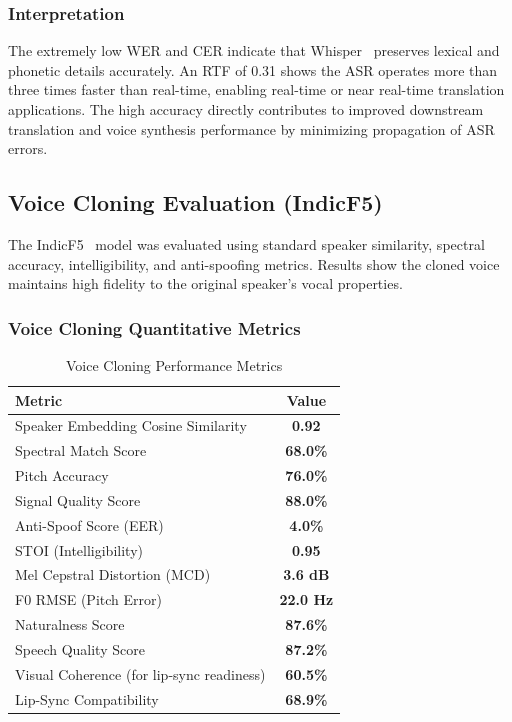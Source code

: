 \documentclass[12pt,oneside]{report}
\begin{document}
\subsubsection*{Interpretation}

The extremely low WER and CER indicate that Whisper~\cite{radford2023whisper} preserves lexical and phonetic details accurately.  
An RTF of 0.31 shows the ASR operates more than three times faster than real-time, enabling real-time or near real-time translation applications. The high accuracy directly contributes to improved downstream translation and voice synthesis performance by minimizing propagation of ASR errors.


\subsection{Voice Cloning Evaluation (IndicF5)}

The IndicF5~\cite{indicf5_2025} model was evaluated using standard speaker similarity, spectral accuracy, intelligibility, and anti-spoofing metrics. Results show the cloned voice maintains high fidelity to the original speaker's vocal properties.

\subsubsection*{Voice Cloning Quantitative Metrics}

\begin{table}[H]
\centering
\caption{Voice Cloning Performance Metrics}
\label{tab:voice-results}
\begin{tabular}{@{}lc@{}}
\toprule
\textbf{Metric} & \textbf{Value} \\
\midrule
Speaker Embedding Cosine Similarity & \textbf{0.92} \\
Spectral Match Score & \textbf{68.0\%} \\
Pitch Accuracy & \textbf{76.0\%} \\
Signal Quality Score & \textbf{88.0\%} \\
Anti-Spoof Score (EER) & \textbf{4.0\%} \\
STOI (Intelligibility) & \textbf{0.95} \\
Mel Cepstral Distortion (MCD) & \textbf{3.6 dB} \\
F0 RMSE (Pitch Error) & \textbf{22.0 Hz} \\
Naturalness Score & \textbf{87.6\%} \\
Speech Quality Score & \textbf{87.2\%} \\
Visual Coherence (for lip-sync readiness) & \textbf{60.5\%} \\
Lip-Sync Compatibility & \textbf{68.9\%} \\
\bottomrule
\end{tabular}
\end{table}
\end{document}
